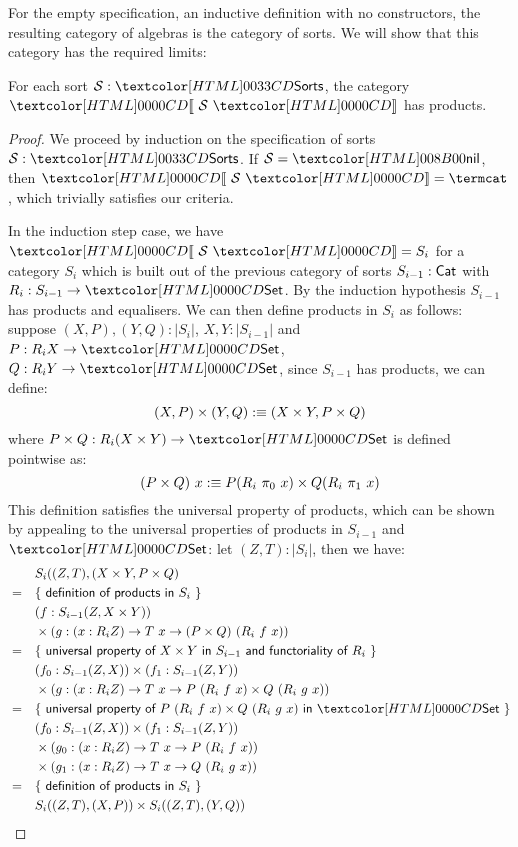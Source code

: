 For the empty specification, an inductive definition with no
constructors, the resulting category of algebras is the category of
sorts. We will show that this category has the required limits:

\begin{lemma}
\label{sorts-products}
  For each sort $\Ss : \Sorts$, the category $\SortCat{\Ss}$ has
  products.
\end{lemma}

\begin{proof}
  We proceed by induction on the specification of sorts
  $\Ss : \Sorts$.  If $\Ss = \nil$, then $\SortCat{\Ss} = \termcat$,
  which trivially satisfies our criteria.

  In the induction step case, we have $\SortCat{\Ss} = S_i$ for a
  category $S_i$ which is built out of the previous category of sorts
  $S_{i-1} : \mathsf{Cat}$ with $R_i : S_{i-1} \to \Set$. By the induction
  hypothesis $S_{i-1}$ has products and equalisers. We can then define
  products in $S_{i}$ as follows: suppose $(X,P), (Y,Q) : | S_{i} |$,
  \ie $X, Y : | S_{i-1} |$ and $P : R_i X \to \Set$,
  $Q : R_i Y \to \Set$, since $S_{i-1}$ has products, we can define:
  \[
    (X,P) \times (Y,Q) :\equiv (X \times Y , P \times Q)
  \]
  where $P \times Q : R_i (X \times Y) \to \Set$ is defined pointwise
  as:
  \[
    (P \times Q)\ x :\equiv P (R_i\ \pi_0\ x) \times Q (R_i\ \pi_1\ x)
  \]
  This definition satisfies the universal property of products, which
  can be shown by appealing to the universal properties of products in
  $S_{i-1}$ and $\Set$: let $(Z,T) : | S_{i} |$, then we have:
  \begin{align*}
    &&&S_i((Z,T),(X \times Y, P \times Q) \\
    &=& &\reasontext{definition of products in $S_i$} \\
    &&& (f : S_{i-1}(Z,X \times Y)) \\
    &&& \times (g : (x : R_i Z) \to T\ x \to (P \times Q)\ (R_i\ f\ x)) \\
    &=& &\reasontext{universal property of $X \times Y$ in $S_{i-1}$ and functoriality of $R_i$} \\
    &&& (f_0 : S_{i-1}(Z,X)) \times (f_1 : S_{i-1}(Z,Y)) \\
    &&& \times (g : (x : R_iZ) \to T\ x \to P\ (R_i\ f\ x) \times Q\ (R_i\ g\ x)) \\
    &=& &\reasontext{universal property of $P\ (R_i\ f\ x) \times Q\ (R_i\ g\ x)$ in $\Set$} \\
    &&& (f_0 : S_{i-1}(Z,X)) \times (f_1 : S_{i-1}(Z,Y)) \\
    &&& \times (g_0 : (x : R_iZ) \to T\ x \to P\ (R_i\ f\ x)) \\
    &&& \times (g_1 : (x : R_iZ) \to T\ x \to Q\ (R_i\ g\ x)) \\
    &=& &\reasontext{definition of products in $S_i$} \\
    &&& S_i((Z,T),(X,P)) \times S_i((Z,T),(Y,Q))
  \end{align*}
\end{proof}

